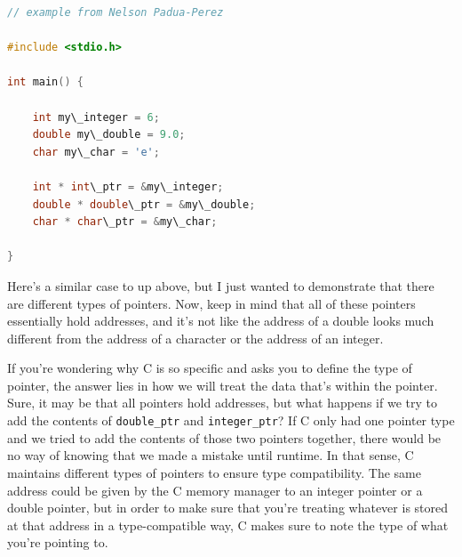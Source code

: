 \documentclass[english, 10pt]{article}
\begin{document}
{


	
\begin{lstlisting}[language=C]
// example from Nelson Padua-Perez

#include <stdio.h>                                                                    
                                                                                      
int main() {                                                                          

	int my\_integer = 6;
	double my\_double = 9.0;
	char my\_char = 'e';
	
	int * int\_ptr = &my\_integer;
	double * double\_ptr = &my\_double;
	char * char\_ptr = &my\_char;
	
}
\end{lstlisting}


}

Here's a similar case to up above, but I just wanted to demonstrate that there are different types of pointers. Now, keep in mind that all of these pointers essentially hold addresses, and it's not like the address of a double looks much different from the address of a character or the address of an integer.\newline

If you're wondering why C is so specific and asks you to define the type of pointer, the answer lies in how we will treat the data that's within the pointer. Sure, it may be that all pointers hold addresses, but what happens if we try to add the contents of \texttt{double\_ptr} and \texttt{integer\_ptr}? If C only had one pointer type and we tried to add the contents of those two pointers together, there would be no way of knowing that we made a mistake until runtime. In that sense, C maintains different types of pointers to ensure type compatibility. The same address could be given by the C memory manager to an integer pointer or a double pointer, but in order to make sure that you're treating whatever is stored at that address in a type-compatible way, C makes sure to note the type of what you're pointing to.
\end{document}
